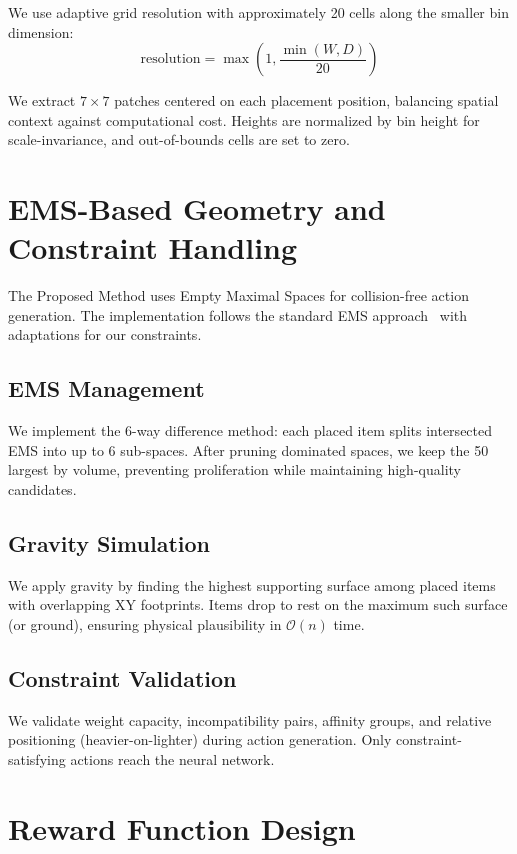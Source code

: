 We use adaptive grid resolution with approximately 20 cells along the smaller bin dimension:
\begin{equation}
\text{resolution} = \max\left(1, \frac{\min(W, D)}{20}\right)
\end{equation}

We extract $7 \times 7$ patches centered on each placement position, balancing spatial context against computational cost. Heights are normalized by bin height for scale-invariance, and out-of-bounds cells are set to zero.

\section{EMS-Based Geometry and Constraint Handling}

The Proposed Method uses Empty Maximal Spaces for collision-free action generation. The implementation follows the standard EMS approach~\cite{crainic2012packing} with adaptations for our constraints.

\subsection{EMS Management}

We implement the 6-way difference method: each placed item splits intersected EMS into up to 6 sub-spaces. After pruning dominated spaces, we keep the 50 largest by volume, preventing proliferation while maintaining high-quality candidates.

\subsection{Gravity Simulation}

We apply gravity by finding the highest supporting surface among placed items with overlapping XY footprints. Items drop to rest on the maximum such surface (or ground), ensuring physical plausibility in $\mathcal{O}(n)$ time.

\subsection{Constraint Validation}

We validate weight capacity, incompatibility pairs, affinity groups, and relative positioning (heavier-on-lighter) during action generation. Only constraint-satisfying actions reach the neural network.

\section{Reward Function Design}

